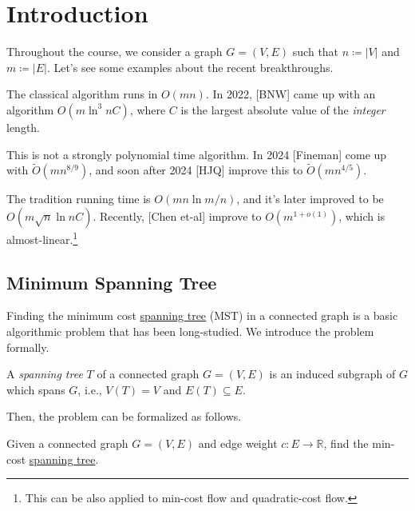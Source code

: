 \chapter{Introduction}
Throughout the course, we consider a graph \(G=(V, E)\) such that \(n \coloneqq \lvert V \rvert \) and \(m\coloneqq \lvert E \rvert \). Let's see some examples about the recent breakthroughs.

\begin{eg}
	The classical algorithm runs in \(O(mn)\). In 2022, [BNW] came up with an algorithm \(O(m \ln ^3 n C)\), where \(C\) is the largest absolute value of the \emph{integer} length.

	This is not a strongly polynomial time algorithm. In 2024 [Fineman] come up with \(\widetilde{O} (m n^{8 / 9})\), and soon after 2024 [HJQ] improve this to \(\widetilde{O} (m n^{4 / 5})\).
\end{eg}

\begin{eg}[\(s\)-\(t\) maxflow]
	The tradition running time is \(O(mn \ln m / n)\), and it's later improved to be \(O(m \sqrt{n} \ln n C)\). Recently, [Chen et-al] improve to \(O(m^{1 + o(1)})\), which is almost-linear.\footnote{This can be also applied to min-cost flow and quadratic-cost flow.}
\end{eg}

\section{Minimum Spanning Tree}
Finding the minimum cost \hyperref[def:spanning-tree]{spanning tree} (MST) in a connected graph is a basic algorithmic problem that has been long-studied. We introduce the problem formally.

\begin{definition}\label{def:spanning-tree}
	A \emph{spanning tree} \(T\) of a connected graph \(G =(V, E)\) is an induced subgraph of \(G\) which spans \(G\), i.e., \(V(T) = V\) and \(E(T) \subseteq E\).
\end{definition}

Then, the problem can be formalized as follows.

\begin{problem}\label{prb:MST}
Given a connected graph \(G=(V, E)\) and edge weight \(c \colon E \to \mathbb{R} \), find the min-cost \hyperref[def:spanning-tree]{spanning tree}.
\end{problem}

